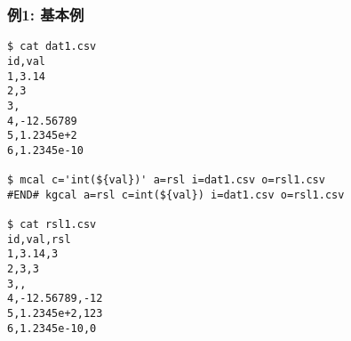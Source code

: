
\subsubsection*{例1: 基本例}


\begin{Verbatim}[baselinestretch=0.7,frame=single]
$ cat dat1.csv
id,val
1,3.14
2,3
3,
4,-12.56789
5,1.2345e+2
6,1.2345e-10

$ mcal c='int(${val})' a=rsl i=dat1.csv o=rsl1.csv
#END# kgcal a=rsl c=int(${val}) i=dat1.csv o=rsl1.csv

$ cat rsl1.csv
id,val,rsl
1,3.14,3
2,3,3
3,,
4,-12.56789,-12
5,1.2345e+2,123
6,1.2345e-10,0
\end{Verbatim}
